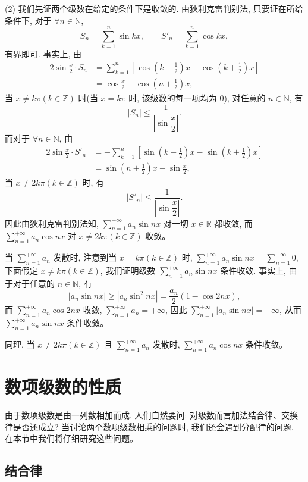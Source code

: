 \documentclass[UTF8,12pt,a4paper,fontset=fandol]{ctexart}
\begin{document}
(2) 我们先证两个级数在给定的条件下是收敛的. 由狄利克雷判别法, 只要证在所给条件下, 对于 $\forall n\in\mathbb{N}$,
\[
  S_n=\sum_{k=1}^n\sin kx,\qquad S'_n=\sum_{k=1}^n\cos kx,
\]
有界即可. 事实上, 由
\[
\begin{aligned}
  2\sin\frac{x}{2}\cdot S_n
  &=\sum_{k=1}^n\left[\cos\left(k-\frac12\right)x-\cos\left(k+\frac12\right)x\right]\\
  &=\cos\frac{x}{2}-\cos\left(n+\frac12\right)x,
\end{aligned}
\]
当 $x\neq k\pi(k\in\mathbb{Z})$ 时(当 $x=k\pi$ 时, 该级数的每一项均为 0), 对任意的 $n\in\mathbb{N}$, 有
\[
  |S_n|\leq\frac1{\left|\sin\dfrac{x}{2}\right|}.
\]
而对于 $\forall n\in\mathbb{N}$, 由
\[
\begin{aligned}
  2\sin\frac{x}{2}\cdot S'_n
  &=-\sum_{k=1}^n\left[\sin\left(k-\frac12\right)x-\sin\left(k+\frac12\right)x\right]\\
  &=\sin\left(n+\frac12\right)x-\sin\frac{x}{2},
\end{aligned}
\]
当 $x\neq2k\pi(k\in\mathbb{Z})$ 时, 有
\[
  |S'_n|\leq\frac1{\left|\sin\dfrac{x}{2}\right|}.
\]
因此由狄利克雷判别法知, $\sum\limits_{n=1}^{+\infty}a_n\sin nx$ 对一切 $x\in\mathbb{R}$ 都收敛, 而 $\sum\limits_{n=1}^{+\infty}a_n\cos nx$ 对 $x\neq2k\pi(k\in\mathbb{Z})$ 收敛。

当 $\sum\limits_{n=1}^{+\infty}a_n$ 发散时, 注意到当 $x=k\pi(k\in\mathbb{Z})$ 时, $\sum\limits_{n=1}^{+\infty}a_n\sin nx=\sum\limits_{n=1}^{+\infty}0$, 下面假定 $x\neq k\pi(k\in\mathbb{Z})$, 我们证明级数 $\sum\limits_{n=1}^{+\infty}a_n\sin nx$ 条件收敛. 事实上, 由于对于任意的 $n\in\mathbb{N}$, 有
\[
  |a_n\sin nx|\geq |a_n\sin^2 nx|=\frac{a_n}{2}(1-\cos2nx),
\]
而 $\sum\limits_{n=1}^{+\infty}a_n\cos2nx$ 收敛, $\sum\limits_{n=1}^{+\infty}a_n=+\infty$, 因此 $\sum\limits_{n=1}^{+\infty}|a_n\sin nx|=+\infty$, 从而 $\sum\limits_{n=1}^{+\infty}a_n\sin nx$ 条件收敛。

同理, 当 $x\neq2k\pi(k\in\mathbb{Z})$ 且 $\sum\limits_{n=1}^{+\infty}a_n$ 发散时, $\sum\limits_{n=1}^{+\infty}a_n\cos nx$ 条件收敛。

\section{数项级数的性质}

由于数项级数是由一列数相加而成, 人们自然要问: 对级数而言加法结合律、交换律是否还成立? 当讨论两个数项级数相乘的问题时, 我们还会遇到分配律的问题. 在本节中我们将仔细研究这些问题。

\subsection{结合律}
\end{document}
